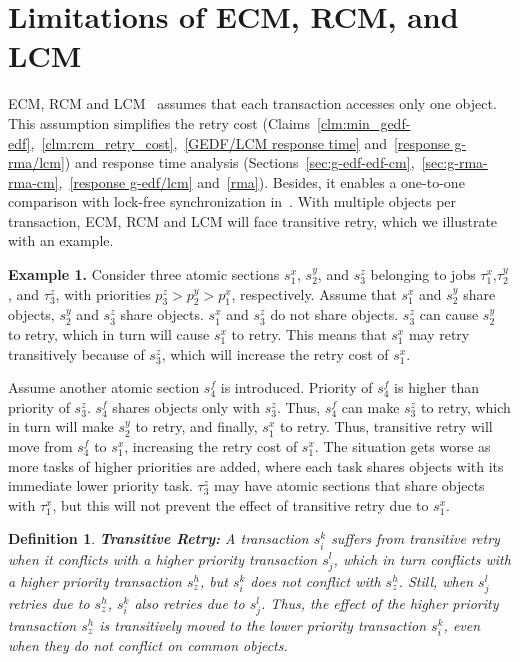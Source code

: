 \documentclass[12pt,english]{report}
\newtheorem{mydef}{Definition}
\begin{document}
\section{Limitations of ECM, RCM, and LCM}\label{probelm description}

ECM, RCM and LCM~\cite{stmconcurrencycontrol:emsoft11,lcmdac2012} assumes that each transaction accesses only one object. This assumption simplifies the retry cost (Claims~\ref{clm:min_gedf-edf},~\ref{clm:rcm_retry_cost},~\ref{GEDF/LCM response time} and~\ref{response g-rma/lcm}) and response time analysis (Sections~\ref{sec:g-edf-edf-cm},~\ref{sec:g-rma-rma-cm},~\ref{response g-edf/lcm} and~\ref{rma}). Besides, it enables a one-to-one comparison with lock-free synchronization in~\cite{key-5}. With multiple objects per transaction, ECM, RCM and LCM will face transitive retry, which we illustrate with an example.


\textbf{Example 1.} Consider three atomic sections $s_{1}^{x}$, $s_{2}^{y}$, 
and $s_{3}^{z}$ belonging to jobs $\tau_{1}^{x}$,$\tau_{2}^{y}$, 
and $\tau_{3}^{z}$, with priorities $p_{3}^{z}>p_{2}^{y}>p_{1}^{x}$, respectively. 
Assume that $s_{1}^{x}$ and $s_{2}^{y}$ share objects, $s_{2}^{y}$ and $s_{3}^{z}$
share objects. $s_{1}^{x}$ and $s_{3}^{z}$ do not share objects.
$s_{3}^{z}$ can cause $s_{2}^{y}$ to retry, which in turn will cause $s_{1}^{x}$ to retry. 
This means that $s_{1}^{x}$ may retry transitively
because of $s_{3}^{z}$, which will increase the retry cost of $s_{1}^{x}$.

Assume another atomic section $s_4^f$ is introduced. Priority of $s_4^f$ is higher than priority of $s_3^z$. $s_4^f$ shares objects only with $s_3^z$. Thus, $s_4^f$ can make $s_3^z$ to retry, which in turn will make $s_2^y$ to retry, and finally, $s_1^x$ to retry. Thus, transitive retry will move from $s_{4}^{f}$ to $s_{1}^{x}$, increasing the retry cost of $s_{1}^{x}$. 
The situation gets worse as more tasks of higher priorities are added, where each task
shares objects with its immediate lower priority task. $\tau_{3}^{z}$
may have atomic sections that share objects with $\tau_{1}^{x}$,
but this will not prevent the effect of transitive retry due to $s_{1}^{x}$.

\begin{mydef}
\textbf{Transitive Retry:} A transaction $s_{i}^{k}$ suffers from
transitive retry when it conflicts with a higher priority transaction
$s_{j}^{l}$, which in turn conflicts with a higher priority transaction
$s_{z}^{h}$, but $s_{i}^{k}$ does not conflict with $s_{z}^{h}$.
Still, when $s_{j}^{l}$ retries due to $s_{z}^{h}$, $s_{i}^{k}$
also retries due to $s_{j}^{l}$. Thus, the effect of the higher priority
transaction $s_{z}^{h}$ is transitively moved to the lower priority
transaction $s_{i}^{k}$, even when they do not conflict on common objects.
\end{mydef}
\end{document}
